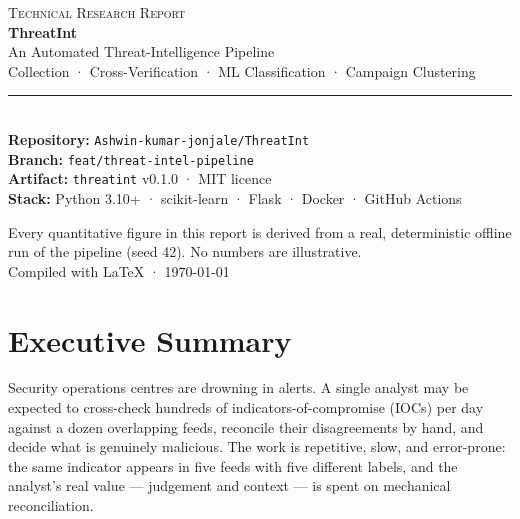 \documentclass[11pt,a4paper]{article}
\begin{document}
\begin{titlepage}
\pagecolor{navy}
\color{white}
\centering
\vspace*{3.2cm}

{\fontsize{15}{18}\selectfont\color{sky}\textsc{Technical Research Report}}\\[0.8cm]
{\fontsize{40}{46}\selectfont\bfseries ThreatInt}\\[0.5cm]
{\fontsize{17}{21}\selectfont\color{white!88} An Automated Threat-Intelligence Pipeline}\\[0.25cm]
{\fontsize{13.5}{17}\selectfont\color{white!75}
Collection · Cross-Verification · ML Classification · Campaign Clustering}\\[2.2cm]

\rule{11cm}{0.6pt}\\[0.8cm]

{\fontsize{12}{15}\selectfont\color{white!85}
\textbf{Repository:} \texttt{Ashwin-kumar-jonjale/ThreatInt}\\[0.3cm]
\textbf{Branch:} \texttt{feat/threat-intel-pipeline}\\[0.3cm]
\textbf{Artifact:} \texttt{threatint} v0.1.0 · MIT licence\\[0.3cm]
\textbf{Stack:} Python 3.10+ · scikit-learn · Flask · Docker · GitHub Actions}

\vfill

{\fontsize{10}{13}\selectfont\color{white!65}
Every quantitative figure in this report is derived from a real, deterministic
offline run of the pipeline (seed 42). No numbers are illustrative.\\[0.4cm]
Compiled with \LaTeX{} · \today}

\end{titlepage}
\pagecolor{white}
\color{ink}

\tableofcontents
\newpage
{}

\section{Executive Summary}

Security operations centres are drowning in alerts. A single analyst may be
expected to cross-check hundreds of indicators-of-compromise (IOCs) per day
against a dozen overlapping feeds, reconcile their disagreements by hand, and
decide what is genuinely malicious. The work is repetitive, slow, and
error-prone: the same indicator appears in five feeds with five different
labels, and the analyst's real value --- judgement and context --- is spent on
mechanical reconciliation.
\end{document}
